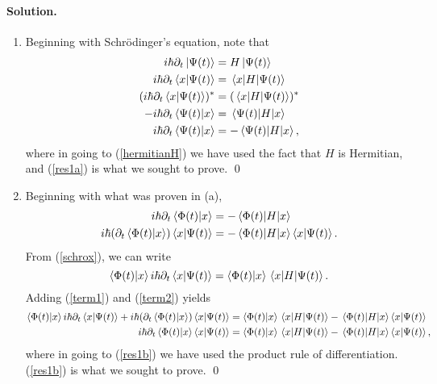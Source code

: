 \documentclass[10pt]{article}
\newcommand{\refeq}[1]{(\ref{#1})}
\newenvironment{solution}
{
    \paragraph{Solution.}
    \ignorespaces
}
{
    \bigskip
}
\newcommand{\Schrodinger}{Schr\"{o}dinger}
\begin{document}
\begin{solution}
	\renewcommand{\theenumi}{\alph{enumi}}
	\begin{enumerate} \label{a}
		\item Beginning with \Schrodinger's equation, note that
			\begin{align}
				i \hbar \partial_t \ket{\Psi(t)} &= H \ket{\Psi(t)} \\
				i \hbar \partial_t \braket{x}{\Psi(t)} &= \mel{x}{H}{\Psi(t)} \label{schrox} \\
				(i \hbar \partial_t \braket{x}{\Psi(t)})^* &= (\mel{x}{H}{\Psi(t)})^* \\
				-i \hbar \partial_t \braket{\Psi(t)}{x} &= \mel{\Psi(t)}{H}{x} \label{hermitianH} \\
				i \hbar \partial_t \braket{\Psi(t)}{x} &= -\mel{\Psi(t)}{H}{x}, \label{res1a}
			\end{align}
			where in going to \refeq{hermitianH} we have used the fact that $H$ is Hermitian, and \refeq{res1a} is what we sought to prove. \qed
			
		\item Beginning with what was proven in (a),
			\begin{align}
				i \hbar \partial_t \braket{\Phi(t)}{x} &= -\mel{\Phi(t)}{H}{x} \\
				i \hbar (\partial_t \braket{\Phi(t)}{x}) \braket{x}{\Psi(t)} &= -\mel{\Phi(t)}{H}{x} \braket{x}{\Psi(t)}. \label{term1}
			\end{align}
			From \refeq{schrox}, we can write
			\begin{equation}
				\braket{\Phi(t)}{x} i \hbar \partial_t \braket{x}{\Psi(t)} = \braket{\Phi(t)}{x} \mel{x}{H}{\Psi(t)}. \label{term2}
			\end{equation}
			Adding \refeq{term1} and \refeq{term2} yields
			\begin{align}
				\braket{\Phi(t)}{x} i \hbar \partial_t \braket{x}{\Psi(t)} + i \hbar (\partial_t \braket{\Phi(t)}{x}) \braket{x}{\Psi(t)} &= \braket{\Phi(t)}{x} \mel{x}{H}{\Psi(t)} - \mel{\Phi(t)}{H}{x} \braket{x}{\Psi(t)} \\
				i \hbar \partial_t \braket{\Phi(t)}{x} \braket{x}{\Psi(t)} &= \braket{\Phi(t)}{x} \mel{x}{H}{\Psi(t)} - \mel{\Phi(t)}{H}{x} \braket{x}{\Psi(t)}, \label{res1b}
			\end{align}
			where in going to \refeq{res1b} we have used the product rule of differentiation.   \refeq{res1b} is what we sought to prove. \qed
			

\end{enumerate}
\end{solution}
\end{document}
